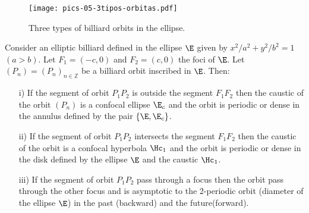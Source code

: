  \begin{figure}
	\begin{center}
	 \texttt{[image: pics-05-3tipos-orbitas.pdf]}
		\caption{Three types of billiard orbits in the ellipse.}
	\end{center}
\label{fig:caustic1}
\end{figure} 
 
 \begin{theorem}
 Consider an  elliptic billiard defined  in the ellipse $\E$ given by $x^2/a^2+y^2/b^2=1$ $(a>b)$. Let $F_1=(-c,0)$ and $F_2=(c,0) $ the foci of $\E$. Let $(P_n)=(P_n)_{n\in\mathbb{Z}}$ be a billiard orbit inscribed in $\E$. Then:
 
 \begin{itemize} 
 \item[i)] If the segment of orbit $P_1 P_2$ is outside the segment $F_1F_2$ then the caustic of the orbit $(P_n)$ is a confocal ellipse $\E_c$ and the orbit is periodic or dense in the annulus defined by the pair  $\{\E,   \E_c \}$.
 
  \item[ii)] If the segment of orbit $P_1P_2$   intersects the segment $F_1F_2$ then the caustic of the orbit is a confocal hyperbola  $\Hc_1$ and the orbit is periodic or dense in the disk defined by the ellipse $\E$ and the caustic $\Hc_1$.
  
   \item[iii)] If the segment of orbit $P_1P_2$ pass through a focus  then the orbit pass through the other focus and is asymptotic to the 2-periodic orbit (diameter of the ellipse $\E$) in the past (backward) and  the future(forward).
\end{itemize}
\end{theorem}

